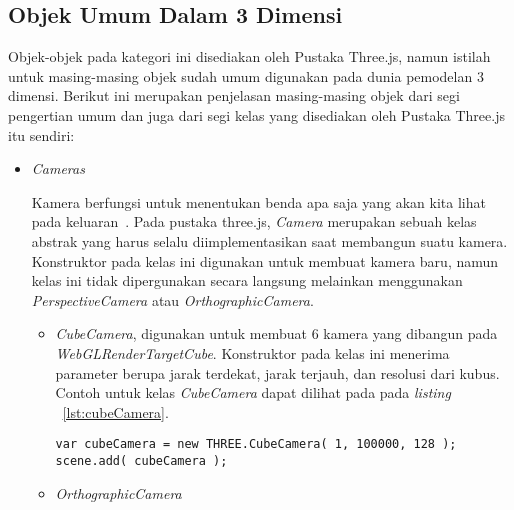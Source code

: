 \subsection{Objek Umum Dalam 3 Dimensi}
Objek-objek pada kategori ini disediakan oleh Pustaka Three.js, namun istilah untuk masing-masing objek sudah umum digunakan pada dunia pemodelan 3 dimensi. Berikut ini merupakan penjelasan masing-masing objek dari segi pengertian umum dan juga dari segi kelas yang disediakan oleh Pustaka Three.js itu sendiri:

\begin{itemize}

	\item \textit{Cameras}

	Kamera berfungsi untuk menentukan benda apa saja yang akan kita lihat pada keluaran~\cite{learningThreejs}. Pada pustaka three.js, {\it Camera} merupakan sebuah kelas abstrak yang harus selalu diimplementasikan saat membangun suatu kamera. Konstruktor pada kelas ini digunakan untuk membuat kamera baru, namun kelas ini tidak dipergunakan secara langsung melainkan menggunakan {\it PerspectiveCamera} atau {\it OrthographicCamera}.

	\begin{itemize}
		\item {\it CubeCamera}, digunakan untuk membuat 6 kamera yang dibangun pada {\it WebGLRenderTargetCube}. Konstruktor pada kelas ini menerima parameter berupa jarak terdekat, jarak terjauh, dan resolusi dari kubus. Contoh untuk kelas {\it CubeCamera} dapat dilihat pada pada {\it listing} ~\ref{lst:cubeCamera}.
\begin{lstlisting}[caption={Contoh instansiasi kelas {\it CubeCamera}.}, label={lst:cubeCamera},captionpos=b]
var cubeCamera = new THREE.CubeCamera( 1, 100000, 128 );
scene.add( cubeCamera );
\end{lstlisting}
		\item{\it OrthographicCamera}
		

\end{itemize}
\end{itemize}
